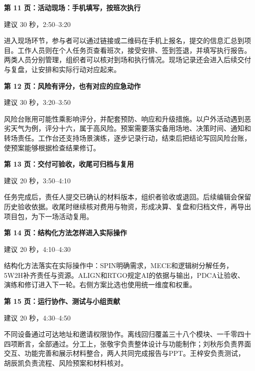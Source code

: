 \documentclass[UTF8,fontset=windows,zihao=-4,a4paper]{ctexart}
\begin{document}
{\large\bfseries\color{ink}第 11 页：活动现场：手机填写，按班次执行}\par
{\small\color{gray}建议 30 秒，2:50–3:20}\par
进入现场环节，参与者可以通过链接或二维码在手机上报名，提交的信息汇总到项目。工作人员则在个人任务页查看班次，接受安排、签到签退，并填写执行报告。两类人员分别管理，组织者可以核对到场和执行情况。现场记录还会进入后续交付与复盘，让安排和实际行动对应起来。\par\vspace{8pt}

{\large\bfseries\color{ink}第 12 页：风险有评分，也有对应的应急动作}\par
{\small\color{gray}建议 30 秒，3:20–3:50}\par
风险台账用可能性乘影响评分，并配套预防、响应和升级措施。以户外活动遇到恶劣天气为例，评分十六，属于高风险。预案需要落实备用场地、决策时间、通知和转场责任。工作台还支持场景演练，逐步记录行动，结束后把结论写回风险台账，使预案能够根据检查结果修订。\par\vspace{8pt}

{\large\bfseries\color{ink}第 13 页：交付可验收，收尾可归档与复用}\par
{\small\color{gray}建议 20 秒，3:50–4:10}\par
任务完成后，责任人提交已确认的材料版本，组织者验收或退回。后续编辑会保留历史验收依据。收尾时继续核对费用与物资，形成决算、复盘和归档文件，再导出项目包，为下一场活动复用。\par\vspace{8pt}

{\large\bfseries\color{ink}第 14 页：结构化方法怎样进入实际操作}\par
{\small\color{gray}建议 20 秒，4:10–4:30}\par
结构化方法落实在实际操作中：SPIN明确需求，MECE和逻辑树分解任务，5W2H补齐责任与资源。ALIGN和RTGO规定AI的依据与输出，PDCA让验收、演练和修订进入下一轮。右侧方案比选也使用统一维度和权重。\par\vspace{8pt}

{\large\bfseries\color{ink}第 15 页：运行协作、测试与小组贡献}\par
{\small\color{gray}建议 20 秒，4:30–4:50}\par
不同设备通过可达地址和邀请权限协作。离线回归覆盖三十八个模块、一千零四十四项断言，全部通过。分工上，张敬宇负责整体设计与功能制作；刘秋彤负责界面交互、功能完善和展示材料整合，两人共同完成报告与PPT。王梓安负责测试，胡辰凯负责流程、风险预案和材料核对。\par\vspace{8pt}
\end{document}

